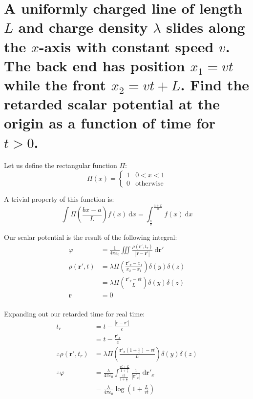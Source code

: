 \documentclass[a4paper]{scrartcl}
\begin{document}
\section{A uniformly charged line of length \(L\) and charge density \(\lambda\) slides along the \(x\)-axis with constant speed \(v\). The back end has position \(x_1 = v t\) while the front \(x_2 = v t + L\). Find the retarded scalar potential at the origin as a function of time for \(t > 0\).}
Let us define the rectangular function \(\Pi\):
\[\Pi(x) = \begin{cases}
    1 & 0 < x < 1 \\
    0 & \text{otherwise}
\end{cases}\]

A trivial property of this function is:
\[\int \Pi\left(\frac{b x - a}{L}\right) f(x) \:\mathrm{d} x = \int_{\frac{a}{b}}^{\frac{a + L}{b}} f(x) \:\mathrm{d} x\]

Our scalar potential is the result of the following integral:
\begin{align*}
    \varphi &= \frac{1}{4 \pi \varepsilon_0} \iiint \frac{\rho(\mathbf{r'}, t_r)}{|\mathbf{r} - \mathbf{r'}|} \:\mathrm{d} \mathbf{r'} \\
    \rho(\mathbf{r'}, t) &= \lambda \Pi\left(\frac{\mathbf{r'}_x - x_1}{x_2 - x_1}\right) \delta(y) \delta(z) \\
    &= \lambda \Pi\left(\frac{\mathbf{r'}_x - v t}{L}\right) \delta(y) \delta(z) \\
    \mathbf{r} &= \mathrm{0} \\
\end{align*}

Expanding out our retarded time for real time:
\begin{align*}
    t_r &= t - \frac{|\mathbf{r} - \mathbf{r'}|}{c} \\
    &= t - \frac{\mathbf{r'}_x}{c} \\
    \therefore \rho(\mathbf{r'}, t_r) &= \lambda \Pi\left(\frac{\mathbf{r'}_x \left(1 + \frac{v}{c}\right) - v t}{L}\right) \delta(y) \delta(z) \\
    \therefore \varphi &= \frac{\lambda}{4 \pi \varepsilon_0} \int_{\frac{v t}{1 + \frac{v}{c}}}^{\frac{v t + L}{1 + \frac{v}{c}}} \frac{1}{|\mathbf{r'}_x|} \:\mathrm{d} \mathbf{r'}_x \\
    &= \frac{\lambda}{4 \pi \varepsilon_0} \log\left(1 + \frac{L}{v t}\right)
\end{align*}
\end{document}
